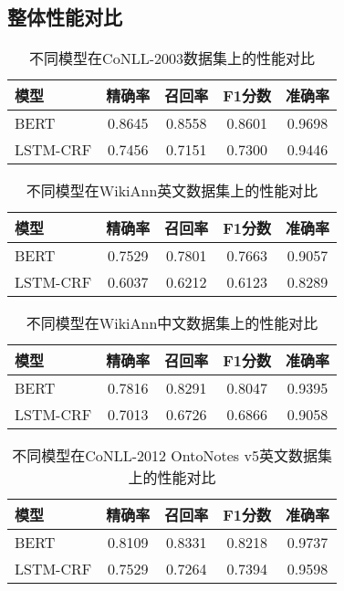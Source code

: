 \documentclass{article}
\begin{document}
\subsection{整体性能对比}

\begin{table}[H]
\centering
\caption{不同模型在CoNLL-2003数据集上的性能对比}
\begin{tabular}{lcccc}
\toprule
模型 & 精确率 & 召回率 & F1分数 & 准确率 \\
\midrule
BERT & 0.8645 & 0.8558 & 0.8601 & 0.9698 \\
LSTM-CRF & 0.7456 & 0.7151 & 0.7300 & 0.9446 \\
\bottomrule
\end{tabular}
\end{table}

\begin{table}[H]
\centering
\caption{不同模型在WikiAnn英文数据集上的性能对比}
\begin{tabular}{lcccc}
\toprule
模型 & 精确率 & 召回率 & F1分数 & 准确率 \\
\midrule
BERT & 0.7529 & 0.7801 & 0.7663 & 0.9057 \\
LSTM-CRF & 0.6037 & 0.6212 & 0.6123 & 0.8289 \\
\bottomrule
\end{tabular}
\end{table}

\begin{table}[H]
\centering
\caption{不同模型在WikiAnn中文数据集上的性能对比}
\begin{tabular}{lcccc}
\toprule
模型 & 精确率 & 召回率 & F1分数 & 准确率 \\
\midrule
BERT & 0.7816 & 0.8291 & 0.8047 & 0.9395 \\
LSTM-CRF & 0.7013 & 0.6726 & 0.6866 & 0.9058 \\
\bottomrule
\end{tabular}
\end{table}

\begin{table}[H]
\centering
\caption{不同模型在CoNLL-2012 OntoNotes v5英文数据集上的性能对比}
\begin{tabular}{lcccc}
\toprule
模型 & 精确率 & 召回率 & F1分数 & 准确率 \\
\midrule
BERT & 0.8109 & 0.8331 & 0.8218 & 0.9737 \\
LSTM-CRF & 0.7529 & 0.7264 & 0.7394 & 0.9598 \\
\bottomrule
\end{tabular}
\end{table}
\end{document}
